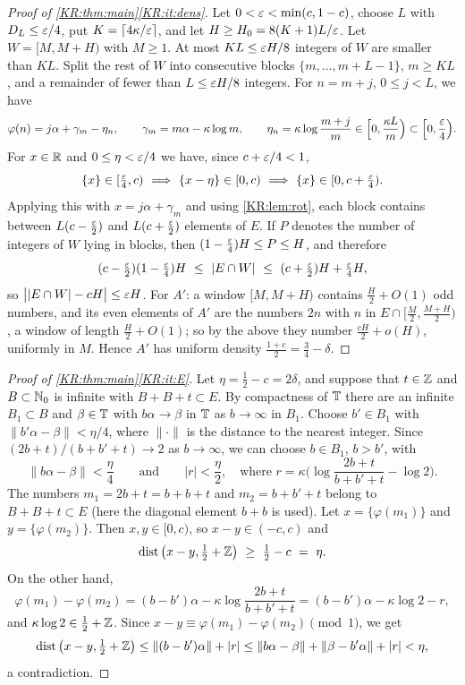 \begin{proof}[Proof of \cref{KR:thm:main}\ref{KR:it:dens}]
Let $0<\varepsilon<\min(c,1-c)$, choose $L$ with $D_L\le\varepsilon/4$, put $K=\lceil4\kappa/\varepsilon\rceil$, and let
$H\ge H_0=8(K+1)L/\varepsilon$. Let $W=[M,M+H)$ with $M\ge1$. At most $KL\le\varepsilon H/8$ integers of $W$ are
smaller than $KL$. Split the rest of $W$ into consecutive blocks $\{m,\dots,m+L-1\}$, $m\ge KL$, and a
remainder of fewer than $L\le\varepsilon H/8$ integers. For $n=m+j$, $0\le j<L$, we have
\[
\varphi(n)=j\alpha+\gamma_m-\eta_n,\qquad \gamma_m=m\alpha-\kappa\log m,\qquad
\eta_n=\kappa\log\frac{m+j}m\in\Big[0,\frac{\kappa L}m\Big)\subset\Big[0,\frac{\varepsilon}4\Big).
\]
For $x\in\mathbb{R}$ and $0\le\eta<\varepsilon/4$ we have, since $c+\varepsilon/4<1$,
\[
\{x\}\in[\tfrac\eps4,c)\ \Longrightarrow\ \{x-\eta\}\in[0,c)\ \Longrightarrow\ \{x\}\in[0,c+\tfrac\eps4).
\]
Applying this with $x=j\alpha+\gamma_m$ and using \cref{KR:lem:rot}, each block contains between
$L(c-\frac{\varepsilon}2)$ and $L(c+\frac{\varepsilon}2)$ elements of $E$. If $P$ denotes the number of integers of $W$ lying in
blocks, then $(1-\frac{\varepsilon}4)H\le P\le H$, and therefore
\[
(c-\tfrac\eps2)(1-\tfrac\eps4)H\ \le\ |E\cap W|\ \le\ (c+\tfrac\eps2)H+\tfrac\eps4H,
\]
so $\big||E\cap W|-cH\big|\le\varepsilon H$. For $A'$: a window $[M,M+H)$ contains $\frac H2+O(1)$ odd numbers,
and its even elements of $A'$ are the numbers $2n$ with $n$ in $E\cap[\frac M2,\frac{M+H}2)$, a window of
length $\frac H2+O(1)$; so by the above they number $\frac{cH}2+o(H)$, uniformly in $M$. Hence $A'$ has
uniform density $\frac{1+c}2=\frac34-\delta$.
\end{proof}

\begin{proof}[Proof of \cref{KR:thm:main}\ref{KR:it:E}]
Let $\eta=\frac12-c=2\delta$, and suppose that $t\in\mathbb{Z}$ and $B\subset\mathbb{N}_0$ is infinite with
$B+B+t\subset E$. By compactness of $\mathbb{T}$ there are an infinite $B_1\subset B$ and $\beta\in\mathbb{T}$ with
$b\alpha\to\beta$ in $\mathbb{T}$ as $b\to\infty$ in $B_1$. Choose $b'\in B_1$ with $\|b'\alpha-\beta\|<\eta/4$, where
$\|\cdot\|$ is the distance to the nearest integer. Since $(2b+t)/(b+b'+t)\to2$ as $b\to\infty$, we can
choose $b\in B_1$, $b>b'$, with
\[
\|b\alpha-\beta\|<\frac\eta4\qquad\text{and}\qquad
|r|<\frac\eta2,\quad\text{where } r=\kappa\Big(\log\frac{2b+t}{b+b'+t}-\log2\Big).
\]
The numbers $m_1=2b+t=b+b+t$ and $m_2=b+b'+t$ belong to $B+B+t\subset E$ (here the diagonal element
$b+b$ is used). Let $x=\{\varphi(m_1)\}$ and $y=\{\varphi(m_2)\}$. Then $x,y\in[0,c)$, so
$x-y\in(-c,c)$ and
\[
\operatorname{dist}\big(x-y,\tfrac12+\Z\big)\ \ge\ \tfrac12-c\ =\ \eta .
\]
On the other hand,
\[
\varphi(m_1)-\varphi(m_2)=(b-b')\alpha-\kappa\log\frac{2b+t}{b+b'+t}=(b-b')\alpha-\kappa\log2-r,
\]
and $\kappa\log2\in\frac12+\mathbb{Z}$. Since $x-y\equiv\varphi(m_1)-\varphi(m_2)\pmod1$, we get
\[
\operatorname{dist}\big(x-y,\tfrac12+\mathbb{Z}\big)\le\|(b-b')\alpha\|+|r|
\le\|b\alpha-\beta\|+\|\beta-b'\alpha\|+|r|<\eta,
\]
a contradiction.
\end{proof}

